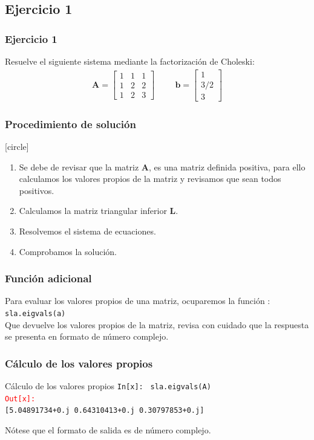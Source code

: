 \subsection{Ejercicio 1}
\begin{frame}
\frametitle{Ejercicio 1}
Resuelve el siguiente sistema mediante la factorización de Choleski:
\begin{align*}
\mathbf{A} =
\begin{bmatrix}
1 & 1 & 1 \\
1 & 2 & 2 \\
1 & 2 & 3
\end{bmatrix}
\hspace{1cm}
\mathbf{b}=
\begin{bmatrix}
1 \\
3/2 \\
3
\end{bmatrix}
\end{align*}
\end{frame}
\begin{frame}
\frametitle{Procedimiento de solución}
[circle]
\begin{enumerate}[<+->]
\item Se debe de revisar que la matriz $\mathbf{A}$, es una matriz definida positiva, para ello calculamos los valores propios de la matriz y revisamos que sean todos positivos.
\item Calculamos la matriz triangular inferior $\mathbf{L}$.
\item Resolvemos el sistema de ecuaciones.
\item Comprobamos la solución.
\end{enumerate}
\end{frame}
\begin{frame}[fragile]
\frametitle{Función adicional}
Para evaluar los valores propios de una matriz, ocuparemos la función :
\\
\medskip
\verb|sla.eigvals(a)|
\\
\medskip
Que devuelve los valores propios de la matriz, revisa con cuidado que la respuesta se presenta en formato de número complejo.
\end{frame}
\begin{frame}[fragile]
\frametitle{Cálculo de los valores propios}
\begin{exampleblock}{Cálculo de los valores propios}
\textcolor{ao}{\texttt{In[x]: }} \texttt{sla.eigvals(A)} \\
\medskip
\pause
\textcolor{red}{\texttt{Out[x]: }} \\
\texttt{[5.04891734+0.j 0.64310413+0.j 0.30797853+0.j]}
\end{exampleblock}
Nótese que el formato de salida es de número complejo.
\end{frame}
